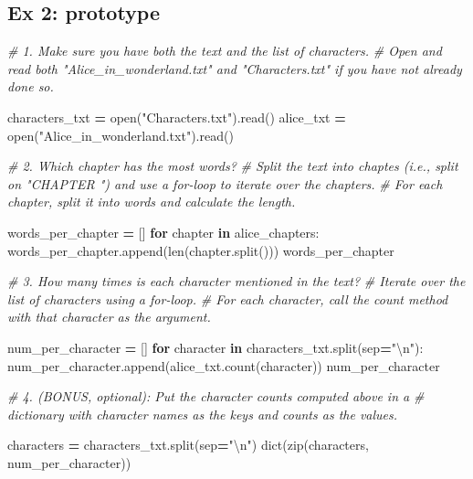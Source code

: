 \documentclass[]{book}
\newenvironment{Shaded}{\begin{snugshade}}{\end{snugshade}}
\newcommand{\BuiltInTok}[1]{#1}
\newcommand{\CharTok}[1]{\textcolor[rgb]{0.31,0.60,0.02}{#1}}
\newcommand{\CommentTok}[1]{\textcolor[rgb]{0.56,0.35,0.01}{\textit{#1}}}
\newcommand{\ControlFlowTok}[1]{\textcolor[rgb]{0.13,0.29,0.53}{\textbf{#1}}}
\newcommand{\KeywordTok}[1]{\textcolor[rgb]{0.13,0.29,0.53}{\textbf{#1}}}
\newcommand{\NormalTok}[1]{#1}
\newcommand{\OperatorTok}[1]{\textcolor[rgb]{0.81,0.36,0.00}{\textbf{#1}}}
\newcommand{\StringTok}[1]{\textcolor[rgb]{0.31,0.60,0.02}{#1}}
\begin{document}
\hypertarget{ex-2-prototype-3}{%
\subsection{Ex 2: prototype}\label{ex-2-prototype-3}}

\begin{Shaded}
\begin{Highlighting}[]
\CommentTok{# 1. Make sure you have both the text and the list of characters.}
\CommentTok{# Open and read both "Alice_in_wonderland.txt" and "Characters.txt" if you have not already done so.}

\NormalTok{characters_txt }\OperatorTok{=} \BuiltInTok{open}\NormalTok{(}\StringTok{"Characters.txt"}\NormalTok{).read()}
\NormalTok{alice_txt }\OperatorTok{=} \BuiltInTok{open}\NormalTok{(}\StringTok{"Alice_in_wonderland.txt"}\NormalTok{).read()}

\CommentTok{# 2. Which chapter has the most words?}
\CommentTok{# Split the text into chaptes (i.e., split on "CHAPTER ") and use a for-loop to iterate over the chapters.}
\CommentTok{# For each chapter, split it into words and calculate the length.}

\NormalTok{words_per_chapter }\OperatorTok{=}\NormalTok{ []}
\ControlFlowTok{for}\NormalTok{ chapter }\KeywordTok{in}\NormalTok{ alice_chapters:}
\NormalTok{    words_per_chapter.append(}\BuiltInTok{len}\NormalTok{(chapter.split()))}
\NormalTok{words_per_chapter}

\CommentTok{# 3. How many times is each character mentioned in the text?}
\CommentTok{# Iterate over the list of characters using a for-loop. }
\CommentTok{# For each character, call the count method with that character as the argument.}

\NormalTok{num_per_character }\OperatorTok{=}\NormalTok{ []}
\ControlFlowTok{for}\NormalTok{ character }\KeywordTok{in}\NormalTok{ characters_txt.split(sep}\OperatorTok{=}\StringTok{"}\CharTok{\textbackslash{}n}\StringTok{"}\NormalTok{):}
\NormalTok{    num_per_character.append(alice_txt.count(character))}
\NormalTok{num_per_character}

\CommentTok{# 4. (BONUS, optional): Put the character counts computed above in a }
\CommentTok{# dictionary with character names as the keys and counts as the values.}

\NormalTok{characters }\OperatorTok{=}\NormalTok{ characters_txt.split(sep}\OperatorTok{=}\StringTok{"}\CharTok{\textbackslash{}n}\StringTok{"}\NormalTok{)}
\BuiltInTok{dict}\NormalTok{(}\BuiltInTok{zip}\NormalTok{(characters, num_per_character))}
\end{Highlighting}
\end{Shaded}
\end{document}

